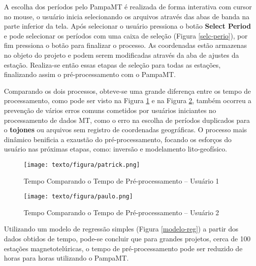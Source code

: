     A escolha dos períodos pelo PampaMT é realizada de forma interativa com cursor no mouse, o usuário inicia selecionando os arquivos  através das abas de banda na parte inferior da tela. Após selecionar o usuário pressiona o botão \textbf{Select Period} e pode selecionar os períodos com uma caixa de seleção (Figura \ref{selc-perio}), por fim pressiona o botão  para finalizar o processo. As coordenadas estão armazenas no objeto do projeto e podem serem modificadas através da aba de ajustes da estação. Realiza-se então essas etapas de seleção para todas as estações, finalizando assim o pré-processamento com o PampaMT.
    
    Comparando os dois processos, obteve-se uma grande diferença entre os tempo de processamento, como pode ser visto na Figura \ref{tempo-pa} e na Figura \ref{tempo-pau}, também ocorreu a prevenção de vários erros comuns cometidos por usuários iniciantes no processamento de dados MT, como o erro na escolha de períodos duplicados para o \textbf{tojones} ou arquivos sem registro de coordenadas geográficas. O processo mais dinâmico benificia a exaustão do pré-processamento, focando os esforços do usuário nas próximas etapas, como: inversão e modelamento lito-geofísico. 
        
    
    \begin{figure}[H]
        \caption{Tempo Comparando o Tempo de Pré-processamento -- Usuário 1}
            \begin{center}
                \texttt{[image: texto/figura/patrick.png]}
            \end{center}
        \legend{\Fonte{\oautor}}
        \label{tempo-pa}
    \end{figure}
    
    \begin{figure}[H]
        \caption{Tempo Comparando o Tempo de Pré-processamento -- Usuário 2}
            \begin{center}
                \texttt{[image: texto/figura/paulo.png]}
            \end{center}
        \legend{\Fonte{\oautor}}
        \label{tempo-pau}
    \end{figure}
    
    
    Utilizando um modelo de regressão simples (Figura \ref{modelo-reg}) a partir dos dados obtidos de tempo, pode-se concluir que para grandes projetos, cerca de 100 estações magnetotelúricas, o tempo de pré-processamento pode ser reduzido de  horas para  horas utilizando o PampaMT.   
    
